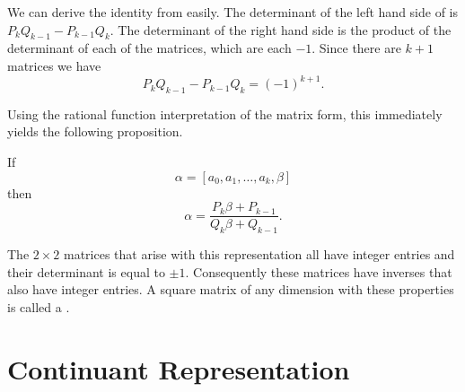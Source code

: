 We can derive the identity  from
 easily.  The determinant of the left
hand side of  is $P_k Q_{k-1}-P_{k-1}
Q_k$.  The determinant of the right hand side is the product of the
determinant of each of the matrices, which are each $-1$.  Since there
are $k+1$ matrices we have
\[
P_k Q_{k-1}-P_{k-1} Q_k = (-1)^{k+1}.
\]

Using the rational function interpretation of the matrix form, this
immediately yields the following proposition.

\begin{proposition}\label{CF:Bilinear:Subst:Prop}
If
\[
\alpha = [a_0, a_1, \ldots, a_k, \beta]
\]
then
\[
\alpha = \frac{P_k \beta + P_{k-1}}{Q_k \beta + Q_{k-1}}.
\]
\end{proposition}

The $2\times 2$ matrices that arise with this representation all have
integer entries and their determinant is equal to $\pm 1$.
Consequently these matrices have inverses that also have integer
entries.  A square matrix of any dimension with these properties is
called a .


\section{Continuant Representation}
\label{CF:Continuant:Sec}


